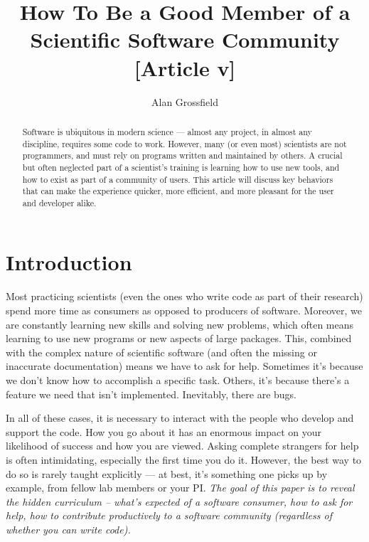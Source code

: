\documentclass[9pt,training,pubversion]{livecoms}
\title{How To Be a Good Member of a Scientific Software Community [Article v\versionnumber]}
\author[1*]{Alan Grossfield}
\affil[1]{University of Rochester Medical Center, Department of Biochemistry and Biophysics}
\begin{document}
\begin{frontmatter}
\maketitle

\begin{abstract}

Software is ubiquitous in modern science --- almost any project, in almost any
discipline, requires some code to work. However, many (or even most) scientists
are not programmers, and must rely on programs written and maintained by others.
A crucial but often neglected part of a scientist's training is
learning how to use new tools, and how to exist as part of a community of users.
This article will discuss key behaviors that can make the experience quicker,
more efficient, and more pleasant for the user and developer alike.


\end{abstract}

\end{frontmatter}




\section{Introduction}

Most practicing scientists (even the ones who write code as part of their
research) spend more time as consumers as opposed to producers of software.
Moreover, we are constantly learning new skills and solving new problems, which
often means learning to use new programs or new aspects of large packages. This,
combined with the complex nature of scientific software (and often the missing
or inaccurate documentation) means we have to ask for help.  Sometimes it's
because we don't know how to accomplish a specific task. Others, it's because
there's a feature we need that isn't implemented. Inevitably, there are bugs.

In all of these cases, it is necessary to interact with the people who develop
and support the code. How you go about it has an enormous impact on your
likelihood of success and how you are viewed. Asking complete strangers for help
is often intimidating, especially the first time you do it. However, the best
way to do so is rarely taught explicitly --- at best, it's something one picks
up by example, from fellow lab members or your PI.  \emph{The goal of this
paper is to reveal the hidden curriculum -- what's expected of a software
consumer, how to ask for help, how to contribute productively to a software
community (regardless of whether you can write code).}
\end{document}
